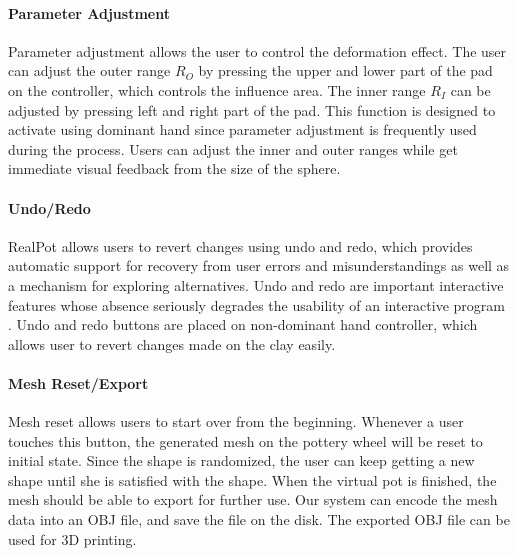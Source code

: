 \documentclass{svjour3}                     %
\begin{document}
\paragraph{Parameter Adjustment}
Parameter adjustment allows the user to control the deformation effect.
The user can adjust the outer range $R_{O}$ by pressing the upper and lower part of the pad on the controller, which controls the influence area. The inner range $R_{I}$ can be adjusted by pressing left and right part of the pad. This function is designed to activate using dominant hand since parameter adjustment is frequently used during the process. Users can adjust the inner and outer ranges while get immediate visual feedback from the size of the sphere.

\paragraph{Undo/Redo}
RealPot allows users to revert changes using undo and redo, which provides automatic support for recovery from user errors and misunderstandings as well as a mechanism for exploring alternatives.
Undo and redo are important interactive features whose absence seriously degrades the usability of an interactive program \cite{choudhary1995general}.
Undo and redo buttons are placed on non-dominant hand controller, which allows user to revert changes made on the clay easily.

\paragraph{Mesh Reset/Export}
Mesh reset allows users to start over from the beginning.
Whenever a user touches this button, the generated mesh on the pottery wheel will be reset to initial state. Since the shape is randomized, the user can keep getting a new shape until she is satisfied with the shape.
When the virtual pot is finished, the mesh should be able to export for further use. Our system can encode the mesh data into an OBJ file, and save the file on the disk. The exported OBJ file can be used for 3D printing.
\end{document}
